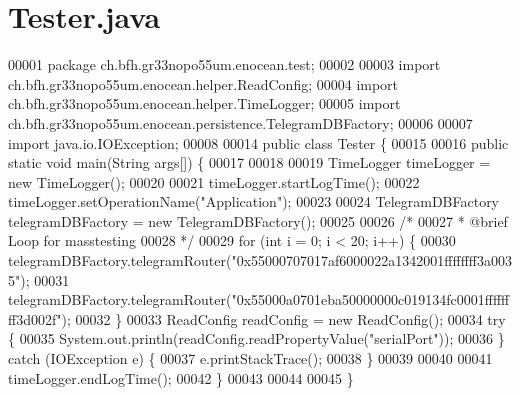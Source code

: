 \section{Tester.\+java}
\label{Tester_8java_source}

\begin{DoxyCode}
00001 \textcolor{keyword}{package }ch.bfh.gr33nopo55um.enocean.test;
00002 
00003 \textcolor{keyword}{import} ch.bfh.gr33nopo55um.enocean.helper.ReadConfig;
00004 \textcolor{keyword}{import} ch.bfh.gr33nopo55um.enocean.helper.TimeLogger;
00005 \textcolor{keyword}{import} ch.bfh.gr33nopo55um.enocean.persistence.TelegramDBFactory;
00006 
00007 \textcolor{keyword}{import} java.io.IOException;
00008 
00014 \textcolor{keyword}{public} \textcolor{keyword}{class }Tester \{
00015 
00016     \textcolor{keyword}{public} \textcolor{keyword}{static} \textcolor{keywordtype}{void} main(String args[]) \{
00017 
00018 
00019         TimeLogger timeLogger = \textcolor{keyword}{new} TimeLogger();
00020 
00021         timeLogger.startLogTime();
00022         timeLogger.setOperationName(\textcolor{stringliteral}{"Application"});
00023 
00024         TelegramDBFactory telegramDBFactory = \textcolor{keyword}{new} TelegramDBFactory();
00025 
00026         \textcolor{comment}{/*}
00027 \textcolor{comment}{        * @brief Loop for masstesting}
00028 \textcolor{comment}{        */}
00029         \textcolor{keywordflow}{for} (\textcolor{keywordtype}{int} i = 0; i < 20; i++) \{
00030             telegramDBFactory.telegramRouter(\textcolor{stringliteral}{"0x55000707017af6000022a1342001ffffffff3a0035"});
00031             telegramDBFactory.telegramRouter(\textcolor{stringliteral}{"0x55000a0701eba50000000c019134fc0001ffffffff3d002f"});
00032         \}
00033         ReadConfig readConfig = \textcolor{keyword}{new} ReadConfig();
00034         \textcolor{keywordflow}{try} \{
00035             System.out.println(readConfig.readPropertyValue(\textcolor{stringliteral}{"serialPort"}));
00036         \} \textcolor{keywordflow}{catch} (IOException e) \{
00037             e.printStackTrace();
00038         \}
00039 
00040 
00041         timeLogger.endLogTime();
00042     \}
00043 
00044 
00045 \}
\end{DoxyCode}

